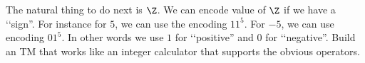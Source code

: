 The natural thing to do next is $\Z$.
We can encode value of $\Z$ if we have a \lq\lq sign''.
For instance for $5$, we can use the encoding $11^5$.
For $-5$, we can use encoding $01^5$.
In other words we use $1$ for \lq\lq positive'' and $0$ for \lq\lq negative''.
Build an TM that works like an integer calculator that
supports the obvious operators.
